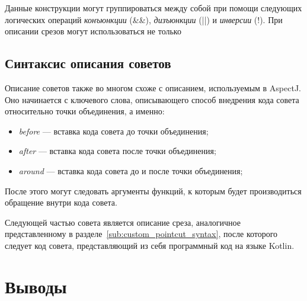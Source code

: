 Данные конструкции могут группироваться между собой при помощи следующих
логических операций \textit{конъюнкции} (\&\&),  \textit{дизъюнкции} (||)  и
\textit{инверсии} (!).
При описании срезов могут использоваться не только 
\subsection{Синтаксис описания советов}
\label{sub:custom_advice_syntax}
Описание советов также во многом схоже с описанием, используемым в AspectJ.
Оно начинается с ключевого слова, описывающего способ внедрения
кода совета относительно точки объединения, а именно:
\begin{itemize}
	\item \textit{before} --- вставка кода совета до точки объединения;
	\item \textit{after} --- вставка кода совета после точки объединения;
	\item \textit{around} --- вставка кода совета до и после точки объединения;
\end{itemize}
После этого могут следовать аргументы функций, к которым будет производиться
обращение внутри кода совета.

Следующей частью совета является описание среза, аналогичное представленному в
разделе~\ref{sub:custom_pointcut_syntax}, после которого следует код совета,
представляющий из себя программный код на языке Kotlin.
\section{Выводы}
\label{sec:design_conclusion}
